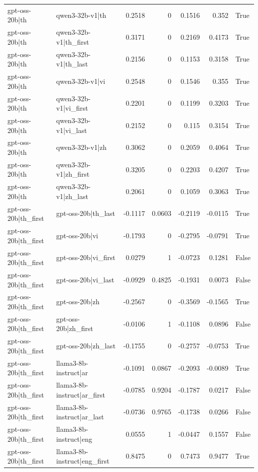 \begin{table}
\begin{tabular}{l l r r r r l}
gpt-oss-20b|th & qwen3-32b-v1|th & 0.2518 & 0 & 0.1516 & 0.352 & True \\
gpt-oss-20b|th & qwen3-32b-v1|th_first & 0.3171 & 0 & 0.2169 & 0.4173 & True \\
gpt-oss-20b|th & qwen3-32b-v1|th_last & 0.2156 & 0 & 0.1153 & 0.3158 & True \\
gpt-oss-20b|th & qwen3-32b-v1|vi & 0.2548 & 0 & 0.1546 & 0.355 & True \\
gpt-oss-20b|th & qwen3-32b-v1|vi_first & 0.2201 & 0 & 0.1199 & 0.3203 & True \\
gpt-oss-20b|th & qwen3-32b-v1|vi_last & 0.2152 & 0 & 0.115 & 0.3154 & True \\
gpt-oss-20b|th & qwen3-32b-v1|zh & 0.3062 & 0 & 0.2059 & 0.4064 & True \\
gpt-oss-20b|th & qwen3-32b-v1|zh_first & 0.3205 & 0 & 0.2203 & 0.4207 & True \\
gpt-oss-20b|th & qwen3-32b-v1|zh_last & 0.2061 & 0 & 0.1059 & 0.3063 & True \\
gpt-oss-20b|th_first & gpt-oss-20b|th_last & -0.1117 & 0.0603 & -0.2119 & -0.0115 & True \\
gpt-oss-20b|th_first & gpt-oss-20b|vi & -0.1793 & 0 & -0.2795 & -0.0791 & True \\
gpt-oss-20b|th_first & gpt-oss-20b|vi_first & 0.0279 & 1 & -0.0723 & 0.1281 & False \\
gpt-oss-20b|th_first & gpt-oss-20b|vi_last & -0.0929 & 0.4825 & -0.1931 & 0.0073 & False \\
gpt-oss-20b|th_first & gpt-oss-20b|zh & -0.2567 & 0 & -0.3569 & -0.1565 & True \\
gpt-oss-20b|th_first & gpt-oss-20b|zh_first & -0.0106 & 1 & -0.1108 & 0.0896 & False \\
gpt-oss-20b|th_first & gpt-oss-20b|zh_last & -0.1755 & 0 & -0.2757 & -0.0753 & True \\
gpt-oss-20b|th_first & llama3-8b-instruct|ar & -0.1091 & 0.0867 & -0.2093 & -0.0089 & True \\
gpt-oss-20b|th_first & llama3-8b-instruct|ar_first & -0.0785 & 0.9204 & -0.1787 & 0.0217 & False \\
gpt-oss-20b|th_first & llama3-8b-instruct|ar_last & -0.0736 & 0.9765 & -0.1738 & 0.0266 & False \\
gpt-oss-20b|th_first & llama3-8b-instruct|eng & 0.0555 & 1 & -0.0447 & 0.1557 & False \\
gpt-oss-20b|th_first & llama3-8b-instruct|eng_first & 0.8475 & 0 & 0.7473 & 0.9477 & True \\

\end{tabular}
\end{table}
